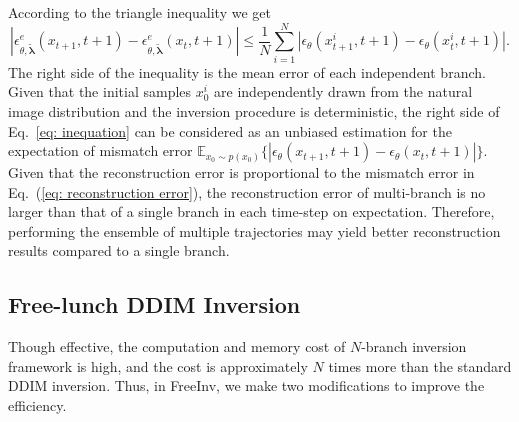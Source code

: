 \documentclass{article}
\newcommand\norm[1]{|#1|}
\begin{document}
According to the triangle inequality we get
\begin{equation}
    \norm{\epsilon_{\theta, \tilde{\boldsymbol{\lambda}}}^{e}\left(x_{t+1}, t+1\right)-\epsilon_{\theta, \tilde{\boldsymbol{\lambda}}}^{e}\left(x_t, t+1\right)} 
    \leq 
    \frac{1}{N}\sum_{i=1}^{N}\norm{\epsilon_{\theta}\left(x_{t+1}^{i}, t+1\right)-\epsilon_{\theta}\left(x_{t}^{i}, t+1\right)}.
\label{eq: inequation}
\end{equation}
The right side of the inequality is the mean error of each independent branch. 
Given that the initial samples $x_{0}^{i}$ are independently drawn from the natural image distribution and the inversion procedure is deterministic,
the right side of Eq.~\ref{eq: inequation} can be considered as an unbiased estimation for the expectation of mismatch error $\mathbb{E}_{x_0\sim p(x_0)}\{\norm{\epsilon_{\theta}\left(x_{t+1}, t+1\right)-\epsilon_{\theta}\left(x_t, t+1\right)}\}$.
Given that the reconstruction error is proportional to the mismatch error in Eq.~(\ref{eq: reconstruction error}), the reconstruction error of multi-branch is no larger than that of a single branch in each time-step on expectation.
Therefore, performing the ensemble of multiple trajectories may yield better reconstruction results compared to a single branch.

\subsection{Free-lunch DDIM Inversion}
\label{sec: freeinv}
Though effective, the computation and memory cost of $N$-branch inversion framework is high, and the cost is approximately $N$ times more than the standard DDIM inversion.
Thus, in FreeInv, we make two modifications to improve the efficiency.
\end{document}
